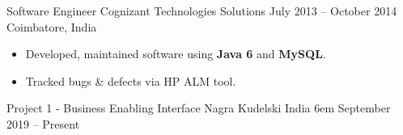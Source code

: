 \documentclass[9.5pt,a4paper]{altacv}
\begin{document}
\divider



\cvexp
{Software Engineer}
{Cognizant Technologies Solutions}
{July 2013 -- October 2014}
{Coimbatore, India}

\begin{itemize}

    \item 
    Developed, maintained software using \textbf{Java 6} and \textbf{MySQL}.
    
    \item 
    Tracked bugs \& defects via HP ALM tool.
    
\end{itemize}





\cvprojects
{Project 1 - Business Enabling Interface}
{Nagra Kudelski India}
{6em}
{September 2019 -- Present}
\end{document}
